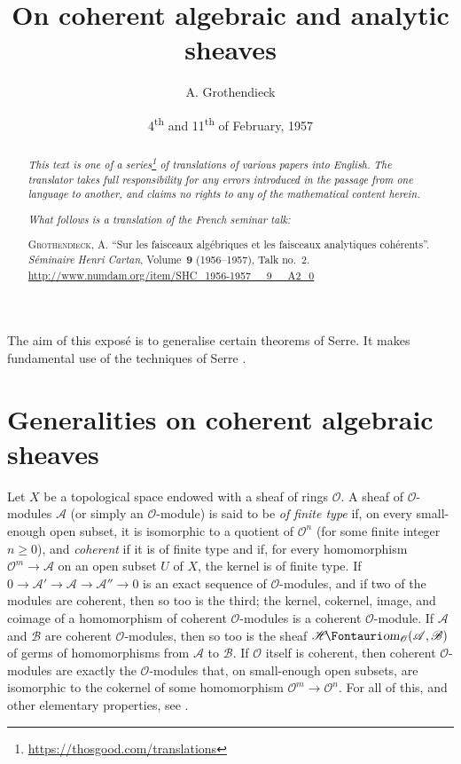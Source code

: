 \documentclass{article}
\title{On coherent algebraic and analytic sheaves}
\author{A. Grothendieck}
\date{4\textsuperscript{th} and 11\textsuperscript{th} of February, 1957}
\newcommand{\doctype}{French seminar talk}
\newcommand{\origcit}{%
  \textsc{Grothendieck, A.}
  ``Sur les faisceaux alg\'{e}briques et les faisceaux analytiques coh\'{e}rents''.
  \emph{S\'{e}minaire Henri Cartan}, Volume~\textbf{9} (1956--1957), Talk no.~2.
  {\url{http://www.numdam.org/item/SHC_1956-1957__9__A2_0}}%
}
\newcommand{\scr}[1]{{\mathscr{#1}}}
\newcommand{\shHom}{\scr{H}\textup{\kern-2.2pt{\Fontauri\slshape om}}}
\renewcommand{\geq}{\geqslant}
\newcommand{\oldpage}[1]{\marginpar{\footnotesize$\Big\vert$ \textit{p.~#1}}}
\begin{document}
\maketitle
\thispagestyle{fancy}

\renewcommand{\abstractname}{Translator's note.}

\begin{abstract}
  \renewcommand*{\thefootnote}{\fnsymbol{footnote}}
  \emph{This text is one of a series\footnote{\url{https://thosgood.com/translations}} of translations of various papers into English.}
  \emph{The translator takes full responsibility for any errors introduced in the passage from one language to another, and claims no rights to any of the mathematical content herein.}

  \medskip
  
  \emph{What follows is a translation of the \doctype:}

  \medskip\noindent
  \origcit
\end{abstract}

\setcounter{footnote}{0}

\tableofcontents
\bigskip



The aim of this expos\'{e} is to generalise certain theorems of Serre.
\oldpage{2-01}
It makes fundamental use of the techniques of Serre \cite{1,2,3}.


\section{Generalities on coherent algebraic sheaves}
\label{section1}

Let $X$ be a topological space endowed with a sheaf of rings $\scr{O}$.
A sheaf of $\scr{O}$-modules $\scr{A}$ (or simply an $\scr{O}$-module) is said to be \emph{of finite type} if, on every small-enough open subset, it is isomorphic to a quotient of $\scr{O}^n$ (for some finite integer $n\geq0$), and \emph{coherent} if it is of finite type and if, for every homomorphism $\scr{O}^m\to\scr{A}$ on an open subset $U$ of $X$, the kernel is of finite type.
If $0\to\scr{A}'\to\scr{A}\to\scr{A}''\to0$ is an exact sequence of $\scr{O}$-modules, and if two of the modules are coherent, then so too is the third;
the kernel, cokernel, image, and coimage of a homomorphism of coherent $\scr{O}$-modules is a coherent $\scr{O}$-module.
If $\scr{A}$ and $\scr{B}$ are coherent $\scr{O}$-modules, then so too is the sheaf $\shHom_\scr{O}(\scr{A},\scr{B})$ of germs of homomorphisms from $\scr{A}$ to $\scr{B}$.
If $\scr{O}$ itself is coherent, then coherent $\scr{O}$-modules are exactly the $\scr{O}$-modules that, on small-enough open subsets, are isomorphic to the cokernel of some homomorphism $\scr{O}^m\to\scr{O}^n$.
For all of this, and other elementary properties, see \cite[chapitre~1, paragraphe~2]{1}.
\end{document}
